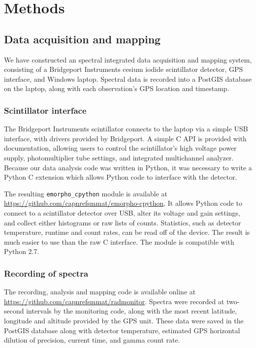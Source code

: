 \chapter{Methods}

\section{Data acquisition and mapping}

We have constructed an spectral integrated data acquisition and mapping system,
consisting of a Bridgeport Instruments cesium iodide scintillator detector, GPS
interface, and Windows laptop. Spectral data is recorded into a
PostGIS\cite{postgis} database on the laptop, along with each observation's GPS
location and timestamp.

\subsection{Scintillator interface}

The Bridgeport Instruments scintillator connects to the laptop via a simple USB
interface, with drivers provided by Bridgeport. A simple C API is provided with
documentation, allowing users to control the scintillator's high voltage power
supply, photomultiplier tube settings, and integrated multichannel
analyzer. Because our data analysis code was written in Python, it was necessary
to write a Python C extension which allows Python code to interface with the
detector.

The resulting \texttt{emorpho\_cpython} module is available at
\url{https://github.com/capnrefsmmat/emorpho-cpython}. It allows Python code to
connect to a scintillator detector over USB, alter its voltage and gain
settings, and collect either histograms or raw lists of counts. Statistics, such
as detector temperature, runtime and count rates, can be read off of the
device. The result is much easier to use than the raw C interface. The module is
compatible with Python 2.7.

\subsection{Recording of spectra}

The recording, analysis and mapping code is available online at
\url{https://github.com/capnrefsmmat/radmonitor}. Spectra were recorded at
two-second intervals by the monitoring code, along with the most recent
latitude, longitude and altitude provided by the GPS unit. These data were saved
in the PostGIS database along with detector temperature, estimated GPS
horizontal dilution of precision, current time, and gamma count rate.

